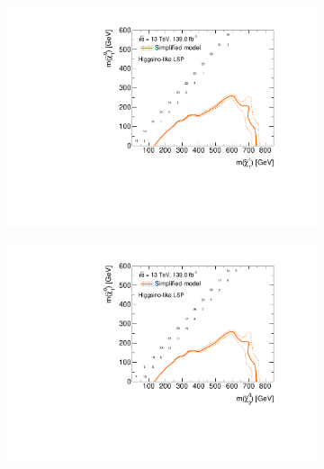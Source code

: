 \begin{figure}
	\centering
	\begin{subfigure}[b]{0.5\linewidth}
		\centering\includegraphics[width=\textwidth]{cut_higgsino_LSP/mchi1p_mlsp_contour}
		\caption{\label{fig:mchi1p_mlsp_contour_higgsino_lsp}}
	\end{subfigure}\hfill
	\begin{subfigure}[b]{0.5\linewidth}
		\centering\includegraphics[width=\textwidth]{cut_higgsino_LSP/mchi20_mlsp_contour}
		\caption{\label{fig:mchi20_mlsp_contour_higgsino_lsp}}
	\end{subfigure}\hfill
	\begin{subfigure}[b]{0.5\linewidth}

\end{subfigure}
\end{figure}

